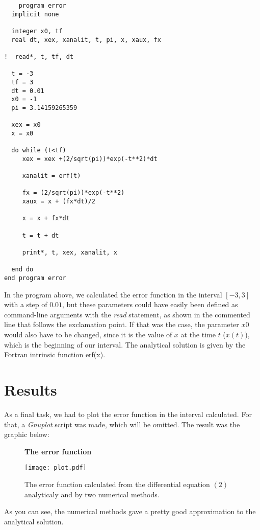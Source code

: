 \documentclass[a4paper,12pt]{article}
\newcommand{\tab}[1][1cm]{\hspace*{#1}}
\newcommand*{\figuretitle}[1]{{\centering \textbf{#1} \par \medskip}}
\begin{document}
\begin{verbatim}
    program error
  implicit none

  integer x0, tf
  real dt, xex, xanalit, t, pi, x, xaux, fx

!  read*, t, tf, dt

  t = -3
  tf = 3
  dt = 0.01
  x0 = -1
  pi = 3.14159265359

  xex = x0
  x = x0

  do while (t<tf)
     xex = xex +(2/sqrt(pi))*exp(-t**2)*dt

     xanalit = erf(t)

     fx = (2/sqrt(pi))*exp(-t**2)
     xaux = x + (fx*dt)/2

     x = x + fx*dt

     t = t + dt
     
     print*, t, xex, xanalit, x
     
  end do
end program error

\end{verbatim}

In the program above, we calculated the error function in the interval $[-3,3]$ with a step of $0.01$, but these parameters could have easily been defined as command-line arguments with the \textit{read} statement, as shown in the commented line that follows the exclamation point. If that was the case, the parameter $x0$ would also have to be changed, since it is the value of $x$ at the time $t$ ($x(t)$), which is the beginning of our interval. The analytical solution is given by the Fortran intrinsic function erf(x).

\section{Results}
\tab As a final task, we had to plot the error function in the interval calculated. For that, a \textit{Gnuplot} script was made, which will be omitted. The result was the graphic below:

\begin{figure}[H]
\begin{center}
\figuretitle{The error function}
\texttt{[image: plot.pdf]}
\caption{The error function calculated from the differential equation $(2)$ analyticaly and by two numerical methods.}
\label{fig1}
\end{center}
\end{figure}

As you can see, the numerical methods gave a pretty good approximation to the analytical solution. 
\end{document}
